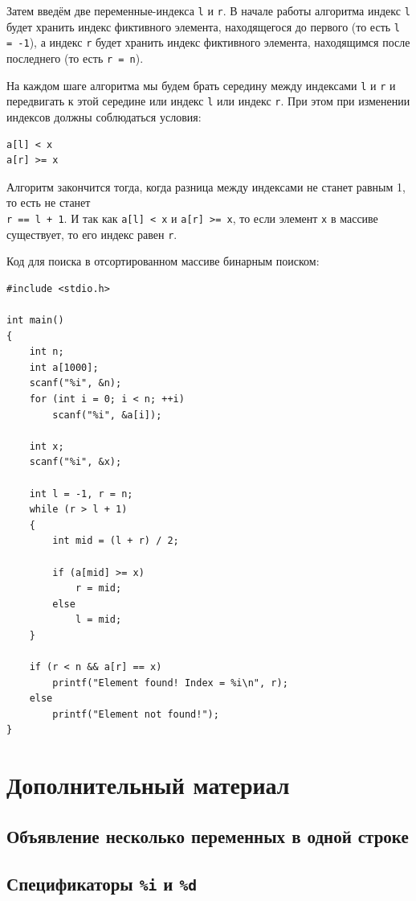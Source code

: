 \documentclass[10pt]{article}
\begin{document}
Затем введём две переменные-индекса \texttt{l} и \texttt{r}. В начале работы алгоритма индекс \texttt{l} будет хранить индекс фиктивного элемента, находящегося до первого (то есть \texttt{l = -1}), а индекс \texttt{r} будет хранить индекс фиктивного элемента, находящимся после последнего (то есть \texttt{r = n}). 

На каждом шаге алгоритма мы будем брать середину между индексами \texttt{l} и \texttt{r} и передвигать к этой середине или индекс \texttt{l} или индекс \texttt{r}. При этом при изменении индексов должны соблюдаться условия:
\begin{verbatim}
a[l] < x
a[r] >= x
\end{verbatim}

Алгоритм закончится тогда, когда разница между индексами не станет равным 1, то есть не станет \\
\texttt{r == l + 1}. И так как \texttt{a[l] < x} и \texttt{a[r] >= x}, то если элемент \texttt{x} в массиве существует, то его индекс равен \texttt{r}.



Код для поиска в отсортированном массиве бинарным поиском:
\begin{lstlisting}
#include <stdio.h>

int main() 
{
    int n;
    int a[1000];
    scanf("%i", &n);
    for (int i = 0; i < n; ++i)
        scanf("%i", &a[i]);
        
    int x;
    scanf("%i", &x);
    
    int l = -1, r = n;
    while (r > l + 1) 
    {
        int mid = (l + r) / 2;
        
        if (a[mid] >= x)
            r = mid;
        else 
            l = mid;
    }
    
    if (r < n && a[r] == x)
        printf("Element found! Index = %i\n", r);
    else
        printf("Element not found!");
}

\end{lstlisting}


\section*{Дополнительный материал}
\subsection*{Объявление несколько переменных в одной строке}
\subsection*{Спецификаторы \texttt{\%i} и \texttt{\%d}}
\end{document}
